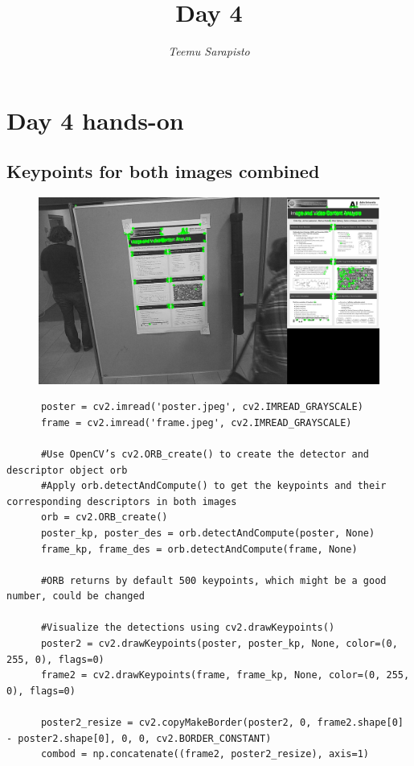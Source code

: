 \documentclass{article}
\begin{document}
\title{Day 4}

\author{\emph{Teemu Sarapisto}}
\maketitle

\newcommand{\aaa}[3]{%
  \fbox{\texttt{[image: \#1]}} \quad
  \fbox{\texttt{[image: \#2]}} \quad
  \fbox{\texttt{[image: \#3]}} \par}
\newcommand{\bbb}[3]{%
  \medskip\noindent\aaa{#1}{#1-#2}{#1-#3}}

\newpage

\setlength{\fboxsep}{0pt}%

\section{Day 4 hands-on }


\subsection{Keypoints for both images combined}
  \begin{figure}[h]
      \centering
      \includegraphics[scale=0.35]{keypoints_combined}
  \end{figure}
  \begin{verbatim}
      poster = cv2.imread('poster.jpeg', cv2.IMREAD_GRAYSCALE)
      frame = cv2.imread('frame.jpeg', cv2.IMREAD_GRAYSCALE)

      #Use OpenCV’s cv2.ORB_create() to create the detector and descriptor object orb
      #Apply orb.detectAndCompute() to get the keypoints and their corresponding descriptors in both images
      orb = cv2.ORB_create()
      poster_kp, poster_des = orb.detectAndCompute(poster, None)
      frame_kp, frame_des = orb.detectAndCompute(frame, None)

      #ORB returns by default 500 keypoints, which might be a good number, could be changed

      #Visualize the detections using cv2.drawKeypoints()
      poster2 = cv2.drawKeypoints(poster, poster_kp, None, color=(0, 255, 0), flags=0)
      frame2 = cv2.drawKeypoints(frame, frame_kp, None, color=(0, 255, 0), flags=0)

      poster2_resize = cv2.copyMakeBorder(poster2, 0, frame2.shape[0] - poster2.shape[0], 0, 0, cv2.BORDER_CONSTANT)
      combod = np.concatenate((frame2, poster2_resize), axis=1)
  \end{verbatim}
\end{document}
